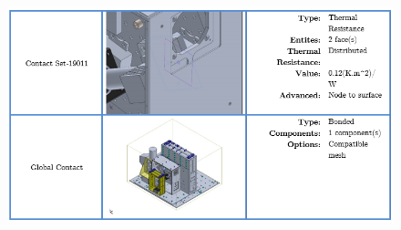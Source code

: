 \begin{figure}
    \centering
    \includegraphics[width=\textwidth]{thermal_load_images/sunrise_TL_images/sunrise_15.PNG}
\end{figure}